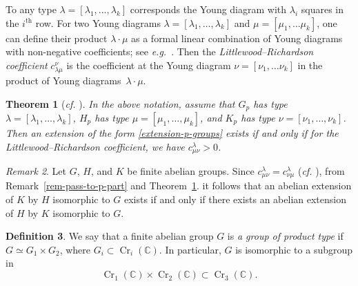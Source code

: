 \documentclass[11pt]{amsart}
\numberwithin{equation}{section}
\newtheorem{thm}{Theorem}[section]
\theoremstyle{definition}
\newtheorem{defin}[thm]{Definition}
\theoremstyle{remark}
\newtheorem{remark}[thm]{Remark}
\DeclareMathOperator{\Cr}{Cr}
\newcommand{\supth}[1]{\ensuremath{#1^{\mathrm{th}}}}
\begin{document}
To any type $\lambda=[\lambda_1,\ldots,\lambda_k]$ corresponds the Young diagram with $\lambda_i$ squares in the $\supth{i}$ row. For two Young diagrams $\lambda=[\lambda_1,\ldots,\lambda_k]$ and $\mu=[\mu_1,\ldots \mu_k]$, one can define their product $\lambda\cdot \mu$ as a formal linear combination of Young diagrams with non-negative coefficients; see \textit{e.g.}~\cite[Section 2]{Fu00}. Then the \emph{Littlewood--Richardson coefficient} $c^\nu_{\lambda\mu}$ is the coefficient at the Young diagram $\nu=[\nu_1,\ldots \nu_k]$ in the product of Young diagrams~$\lambda\cdot \mu$. 

\begin{thm}[\textit{cf.} {\cite[Section 2]{Fu00}}]
\label{thm-fulton}
In the above notation, assume that $G_p$ has type $\lambda=[\lambda_1,\ldots,\lambda_k]$, $H_p$ has type $\mu=[\mu_1,\ldots,\mu_k]$, and $K_p$ has type $\nu=[\nu_1,\ldots,\nu_k]$. 
Then an extension of the form \eqref{extension-p-groups} exists if and only if for the Littlewood--Richardson coefficient, we have $c^\lambda_{\mu\nu}>0$. 
\end{thm}

\begin{remark}
\label{rem-LR-coef-is-symmetric}
Let $G$, $H$, and $K$ be finite abelian groups. Since $c^\lambda_{\mu\nu}=c^\lambda_{\nu\mu}$ (\textit{cf.} \cite[Corollary~I.5.1.3]{Fu06}), from Remark~\ref{rem-pass-to-p-part} and Theorem~\ref{thm-fulton}. it follows that an abelian extension of $K$ by $H$ isomorphic to $G$ exists if and only if there exists an abelian extension of $H$ by $K$ isomorphic to $G$.
\end{remark}

\begin{defin}
\label{cremona-product-list}
We say that a finite abelian group $G$ is \emph{a group of product type} if~$G\simeq G_1\times G_2$, where $G_i\subset \Cr_i(\mathbb{C})$.  In particular, $G$ is isomorphic to a subgroup in
\[
\Cr_1(\mathbb{C})\times\Cr_2(\mathbb{C})\subset
\Cr_3(\mathbb{C}).
\] 
\end{defin}
\end{document}
